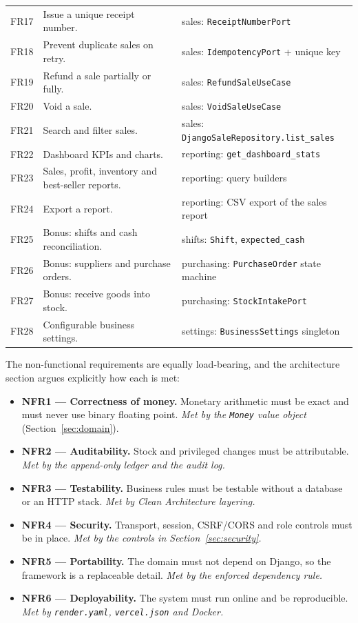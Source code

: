 \documentclass[11pt,a4paper]{article}
\begin{document}
\begin{table}[htbp]
\begin{tabular}{@{}p{}p{}p{}@{}}
FR17 & Issue a unique receipt number. & sales: \texttt{ReceiptNumberPort} \\
FR18 & Prevent duplicate sales on retry. & sales: \texttt{IdempotencyPort} + unique key \\
FR19 & Refund a sale partially or fully. & sales: \texttt{RefundSaleUseCase} \\
FR20 & Void a sale. & sales: \texttt{VoidSaleUseCase} \\
FR21 & Search and filter sales. & sales: \texttt{DjangoSaleRepository.list\_sales} \\
FR22 & Dashboard KPIs and charts. & reporting: \texttt{get\_dashboard\_stats} \\
FR23 & Sales, profit, inventory and best-seller reports. & reporting: query builders \\
FR24 & Export a report. & reporting: CSV export of the sales report \\
FR25 & Bonus: shifts and cash reconciliation. & shifts: \texttt{Shift}, \texttt{expected\_cash} \\
FR26 & Bonus: suppliers and purchase orders. & purchasing: \texttt{PurchaseOrder} state machine \\
FR27 & Bonus: receive goods into stock. & purchasing: \texttt{StockIntakePort} \\
FR28 & Configurable business settings. & settings: \texttt{BusinessSettings} singleton \\
\bottomrule
\end{tabular}
\end{table}

\noindent
The non-functional requirements are equally load-bearing, and the architecture section argues
explicitly how each is met:

\begin{itemize}[leftmargin=1.4em]
  \item \textbf{NFR1 --- Correctness of money.} Monetary arithmetic must be exact and must never use
  binary floating point. \emph{Met by the \texttt{Money} value object} (Section~\ref{sec:domain}).
  \item \textbf{NFR2 --- Auditability.} Stock and privileged changes must be attributable. \emph{Met
  by the append-only ledger and the audit log.}
  \item \textbf{NFR3 --- Testability.} Business rules must be testable without a database or an HTTP
  stack. \emph{Met by Clean Architecture layering.}
  \item \textbf{NFR4 --- Security.} Transport, session, CSRF/CORS and role controls must be in place.
  \emph{Met by the controls in Section~\ref{sec:security}.}
  \item \textbf{NFR5 --- Portability.} The domain must not depend on Django, so the framework is a
  replaceable detail. \emph{Met by the enforced dependency rule.}
  \item \textbf{NFR6 --- Deployability.} The system must run online and be reproducible. \emph{Met by
  \texttt{render.yaml}, \texttt{vercel.json} and Docker.}
\end{itemize}
\end{document}
